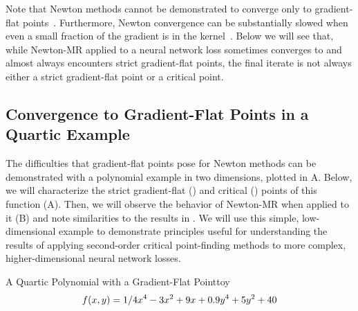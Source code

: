 \documentclass[../../thesis.tex]{subfiles}
\begin{document}
Note that Newton methods cannot be demonstrated to converge
only to gradient-flat points~\cite{powell1970,byrd2004}.
Furthermore, Newton convergence can be substantially slowed
when even a small fraction of the gradient
is in the kernel~\cite{griewank1983}.
Below we will see that,
while Newton-MR applied to a neural network loss
sometimes converges to and almost always encounters strict gradient-flat points,
the final iterate is not always either
a strict gradient-flat point or a critical point.

\subsection{Convergence to Gradient-Flat Points in a Quartic Example}%

The difficulties that gradient-flat points pose for Newton methods
can be demonstrated with a polynomial example in two dimensions,
plotted in A.
Below,
we will characterize
the strict gradient-flat (\failcolor{})
and critical (\successcolor{}) points of this function
(A).
Then, we will observe the behavior of Newton-MR
when applied to it (B)
and note similarities to the results in .
We will use this simple, low-dimensional example
to demonstrate principles useful
for understanding the results of applying
second-order critical point-finding methods to more complex,
higher-dimensional neural network losses.

\begin{example}{A Quartic Polynomial with a Gradient-Flat Point}{toy}
	\begin{equation}\equationlabel{toy}
	    f(x, y) = 1/4 x^4 - 3x^2 + 9x + 0.9y^4 + 5y^2 + 40
	\end{equation}
\end{example}
\end{document}
